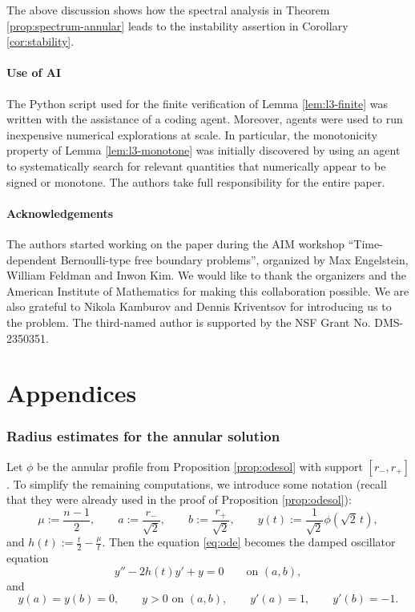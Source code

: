 \documentclass[11pt]{article}
\numberwithin{equation}{section}
\theoremstyle{definition}
\begin{document}
The above discussion shows how the spectral analysis in Theorem \ref{prop:spectrum-annular} leads to the instability assertion in Corollary \ref{cor:stability}.

\subsection*{Use of AI} The Python script used for the finite verification of Lemma \ref{lem:l3-finite} was written with the assistance of a coding agent. Moreover, agents were used to run inexpensive numerical explorations at scale. In particular, the monotonicity property of Lemma \ref{lem:l3-monotone}
was initially discovered by using an agent to systematically search for relevant quantities that numerically appear to be signed or monotone. The authors take full responsibility for the entire paper.


\subsection*{Acknowledgements}
The authors started working on the paper during the AIM workshop ``Time-dependent Bernoulli-type free boundary problems'', organized by Max Engelstein, William Feldman and Inwon Kim. We would like to thank the organizers and the American Institute of Mathematics for making this collaboration possible. We are also grateful to Nikola Kamburov and Dennis Kriventsov for introducing us to the problem.
The third-named author is supported by the NSF Grant No. DMS-2350351.

\appendix
\part*{Appendices}

\section{Radius estimates for the annular solution}\label{sec:radius-est}
Let $\phi$ be the annular profile from Proposition \ref{prop:odesol} with support $[r_-,r_+]$.
To simplify the remaining computations, we introduce some notation (recall that they were already used in the proof of Proposition \ref{prop:odesol}):
\begin{equation}\label{eq:annular-scaled-notation}
    \mu:=\frac{n-1}{2},
    \qquad
    a:=\frac{r_-}{\sqrt2},
    \qquad
    b:=\frac{r_+}{\sqrt2},
    \qquad
    y(t):=\frac1{\sqrt2}\phi(\sqrt2\,t),
\end{equation}
and $h(t):=\frac t2-\frac{\mu}{t}$. Then the equation \eqref{eq:ode} becomes the damped oscillator equation
\begin{equation}\label{eq:annular-y-equation}
    y''-2h(t)y'+y=0
    \qquad\text{on }(a,b),\tag{D}
\end{equation}
and
\begin{equation}\label{eq:annular-y-data}
    y(a)=y(b)=0,\qquad y>0\text{ on }(a,b),
    \qquad y'(a)=1,\qquad y'(b)=-1.
\end{equation}
\end{document}

